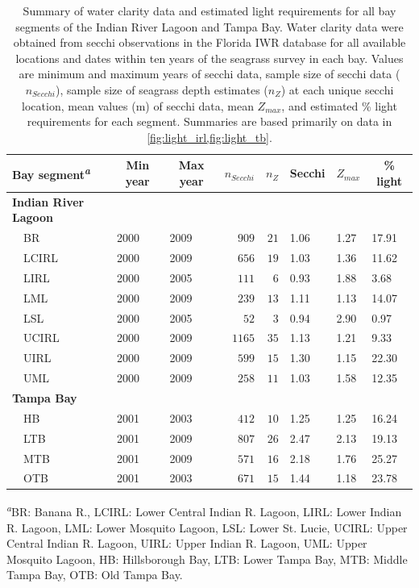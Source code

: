 \documentclass[letterpaper,12pt,oneside]{article}\usepackage[]{graphicx}\usepackage[]{color}
\begin{document}
\begin{table}[!tbp]
\caption{Summary of water clarity data and estimated light requirements for all bay segments of the Indian River Lagoon and Tampa Bay.  Water clarity data were obtained from secchi observations in the Florida \acl{IWR} database for all available locations and dates within ten years of the seagrass survey in each bay.  Values are minimum and maximum years of secchi data, sample size of secchi data ($n_{Secchi}$), sample size of seagrass depth estimates ($n_{Z}$) at each unique secchi location, mean values (m) of secchi data, mean $Z_{max}$, and estimated \% light requirements for each segment.  Summaries are based primarily on data in \cref{fig:light_irl,fig:light_tb}.\label{tab:secc_summ}} 
\begin{center}
\begin{tabular}{lllrrlll}
\hline\hline
\multicolumn{1}{l}{Bay segment\textsuperscript{\textit{a}}}&\multicolumn{1}{c}{Min year}&\multicolumn{1}{c}{Max year}&\multicolumn{1}{c}{$n_{Secchi}$}&\multicolumn{1}{c}{$n_{Z}$}&\multicolumn{1}{c}{Secchi}&\multicolumn{1}{c}{$Z_{max}$}&\multicolumn{1}{c}{\% light}\tabularnewline
\hline
{\bfseries Indian River Lagoon}&&&&&&&\tabularnewline
~~BR&2000&2009&$ 909$&$21$&1.06&1.27&17.91\tabularnewline
~~LCIRL&2000&2009&$ 656$&$19$&1.03&1.36&11.62\tabularnewline
~~LIRL&2000&2005&$ 111$&$ 6$&0.93&1.88& 3.68\tabularnewline
~~LML&2000&2009&$ 239$&$13$&1.11&1.13&14.07\tabularnewline
~~LSL&2000&2005&$  52$&$ 3$&0.94&2.90& 0.97\tabularnewline
~~UCIRL&2000&2009&$1165$&$35$&1.13&1.21& 9.33\tabularnewline
~~UIRL&2000&2009&$ 599$&$15$&1.30&1.15&22.30\tabularnewline
~~UML&2000&2009&$ 258$&$11$&1.03&1.58&12.35\tabularnewline
\hline
{\bfseries Tampa Bay}&&&&&&&\tabularnewline
~~HB&2001&2003&$ 412$&$10$&1.25&1.25&16.24\tabularnewline
~~LTB&2001&2009&$ 807$&$26$&2.47&2.13&19.13\tabularnewline
~~MTB&2001&2009&$ 571$&$16$&2.18&1.76&25.27\tabularnewline
~~OTB&2001&2003&$ 671$&$15$&1.44&1.18&23.78\tabularnewline
\hline
\end{tabular}\end{center}

\textsuperscript{\textit{a}}\footnotesize BR: Banana R., LCIRL: Lower Central Indian R. Lagoon, LIRL: Lower Indian R. Lagoon, LML: Lower Mosquito Lagoon, LSL: Lower St. Lucie, UCIRL: Upper Central Indian R. Lagoon, UIRL: Upper Indian R. Lagoon, UML: Upper Mosquito Lagoon, HB: Hillsborough Bay, LTB: Lower Tampa Bay, MTB: Middle Tampa Bay, OTB: Old Tampa Bay.\end{table}
\end{document}
